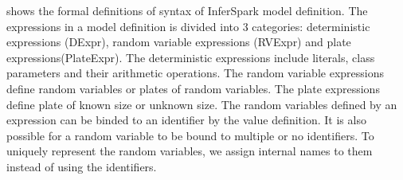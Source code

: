  shows the formal definitions
of syntax of InferSpark model definition. 
The expressions in a model definition is divided into 3
categories: deterministic expressions (DExpr), random variable expressions
(RVExpr) and plate expressions(PlateExpr). 
The deterministic expressions include literals, 
class parameters and their arithmetic operations. The random
variable expressions define random variables or plates of random variables.
The plate expressions define plate of known size or unknown size. The random
variables defined by an expression can be binded to an identifier by the value
definition. It is also possible for a random variable to be bound to multiple
or no identifiers. To uniquely represent the random variables, we assign
internal names to them instead of using the identifiers.


